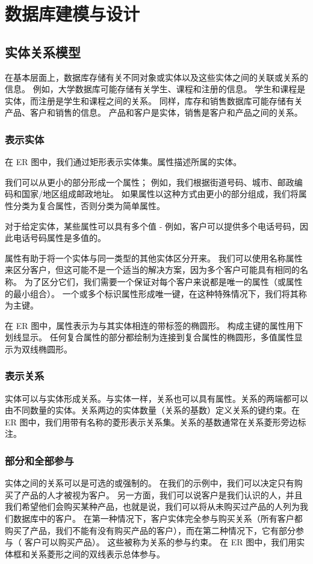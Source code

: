 \chapter{数据库建模与设计}
\section{实体关系模型}
在基本层面上，数据库存储有关不同对象或实体以及这些实体之间的关联或关系的信息。 例如，大学数据库可能存储有关学生、课程和注册的信息。 学生和课程是实体，而注册是学生和课程之间的关系。 同样，库存和销售数据库可能存储有关产品、客户和销售的信息。 产品和客户是实体，销售是客户和产品之间的关系。
\subsection{表示实体}
在 ER 图中，我们通过矩形表示实体集。属性描述所属的实体。

我们可以从更小的部分形成一个属性； 例如，我们根据街道号码、城市、邮政编码和国家/地区组成邮政地址。 如果属性以这种方式由更小的部分组成，我们将属性分类为复合属性，否则分类为简单属性。

对于给定实体，某些属性可以具有多个值 - 例如，客户可以提供多个电话号码，因此电话号码属性是多值的。

属性有助于将一个实体与同一类型的其他实体区分开来。 我们可以使用名称属性来区分客户，但这可能不是一个适当的解决方案，因为多个客户可能具有相同的名称。 为了区分它们，我们需要一个保证对每个客户来说都是唯一的属性（或属性的最小组合）。 一个或多个标识属性形成唯一键，在这种特殊情况下，我们将其称为主键。

在 ER 图中，属性表示为与其实体相连的带标签的椭圆形。 构成主键的属性用下划线显示。 任何复合属性的部分都绘制为连接到复合属性的椭圆形，多值属性显示为双线椭圆形。

\subsection{表示关系}
实体可以与实体形成关系。与实体一样，关系也可以具有属性。关系的两端都可以由不同数量的实体。关系两边的实体数量（关系的基数）定义关系的键约束。在 ER 图中，我们用带有名称的菱形表示关系集。关系的基数通常在关系菱形旁边标注。
\subsection{部分和全部参与}
实体之间的关系可以是可选的或强制的。 在我们的示例中，我们可以决定只有购买了产品的人才被视为客户。 另一方面，我们可以说客户是我们认识的人，并且我们希望他们会购买某种产品，也就是说，我们可以将从未购买过产品的人列为我们数据库中的客户。 在第一种情况下，客户实体完全参与购买关系（所有客户都购买了产品，我们不能有没有购买产品的客户），而在第二种情况下，它有部分参与（ 客户可以购买产品）。 这些被称为关系的参与约束。 在 ER 图中，我们用实体框和关系菱形之间的双线表示总体参与。

